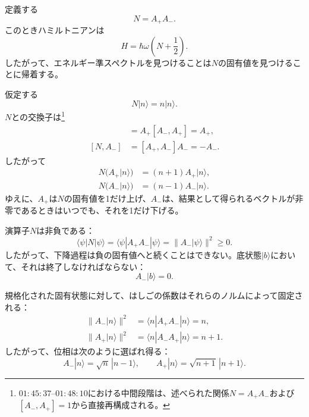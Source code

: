 定義する
\begin{equation}
N=A_+A_-.
\end{equation}
このときハミルトニアンは
\begin{equation}
H=\hbar\omega\left(N+\frac{1}{2}\right).
\end{equation}
したがって、エネルギー準スペクトルを見つけることは\(N\)の固有値を見つけることに帰着する。

仮定する
\begin{equation}
N|n\rangle=n|n\rangle.
\end{equation}
\(N\)との交換子は\footnote{\(01{:}45{:}37\)--\(01{:}48{:}10\)における中間段階は、述べられた関係\(N=A_+A_-\)および\([A_-,A_+]=1\)から直接再構成される。}
\begin{align}
[N,A_+]
&=A_+[A_-,A_+]=A_+, \\
[N,A_-]
&=[A_+,A_-]A_-=-A_-.
\end{align}
したがって
\begin{align}
N\bigl(A_+|n\rangle\bigr)
&=(n+1)A_+|n\rangle, \\
N\bigl(A_-|n\rangle\bigr)
&=(n-1)A_-|n\rangle.
\end{align}
ゆえに、\(A_+\)は\(N\)の固有値を1だけ上げ、\(A_-\)は、結果として得られるベクトルが非零であるときはいつでも、それを1だけ下げる。

演算子\(N\)は非負である：
\begin{equation}
\langle\psi|N|\psi\rangle
=\langle\psi|A_+A_-|\psi\rangle
=\|A_-|\psi\rangle\|^2
\geq0.
\end{equation}
したがって、下降過程は負の固有値へと続くことはできない。底状態\(|b\rangle\)において、それは終了しなければならない：
\begin{equation}
A_-|b\rangle=0.
\end{equation}

規格化された固有状態に対して、はしごの係数はそれらのノルムによって固定される：
\begin{align}
\|A_-|n\rangle\|^2
&=\langle n|A_+A_-|n\rangle=n, \\
\|A_+|n\rangle\|^2
&=\langle n|A_-A_+|n\rangle=n+1.
\end{align}
したがって、位相は次のように選ばれ得る：
\begin{equation}
A_-|n\rangle=\sqrt{n}\,|n-1\rangle,
\qquad
A_+|n\rangle=\sqrt{n+1}\,|n+1\rangle.
\end{equation}

\begin{classroomqa}
\end{classroomqa}


